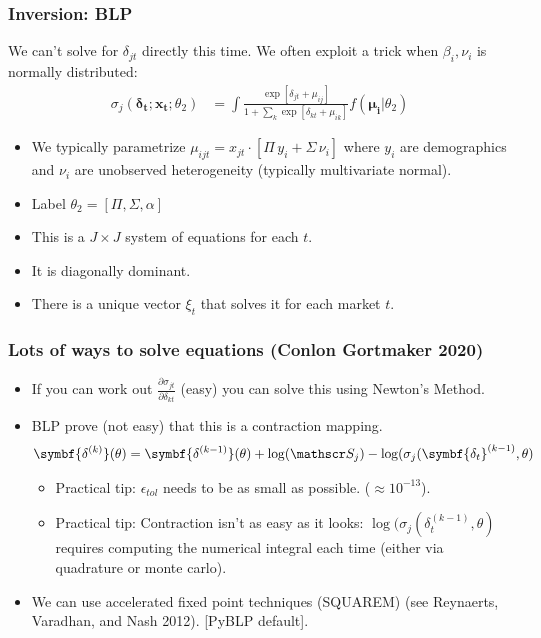 \documentclass[aspectratio=169,10pt]{beamer}
\begin{document}
\begin{frame}
\frametitle{Inversion: BLP}
We can't solve for $\delta_{jt}$ directly this time. We often exploit a trick when $\beta_i,\nu_i$ is normally distributed:
\begin{align*}
\sigma_j(\symbf{\delta_t}; \symbf{x_t}; \theta_2) &= \int \frac{\exp[\delta_{jt} +  \mu_{ij} ]}{1+\sum_k \exp[\delta_{kt} + \mu_{ik} ]} f(\symbf{\mu_i}| \theta_2)
\end{align*}
 \begin{itemize}
    \item We typically parametrize $\mu_{ijt} = x_{jt} \cdot [\Pi \, y_i + \Sigma \, \nu_{i}]$ where $y_i$ are demographics and $\nu_i$ are unobserved heterogeneity (typically multivariate normal).
    \item Label $\theta_2 = [\Pi, \Sigma, \alpha]$
 \item This is a $J \times J$ system of equations for each $t$.
 \item It is diagonally dominant.
 \item There is a unique vector $\xi_t$ that solves it for each market $t$.
 \end{itemize}
\end{frame}

\begin{frame}
\frametitle{Lots of ways to solve equations (Conlon Gortmaker 2020)}
 \begin{itemize}
     \item If you can work out $\frac{\partial \sigma_{jt}}{\partial \delta_{kt}}$ (easy) you can solve this using Newton's Method. 
 \item BLP prove (not easy) that this is a \alert{contraction mapping}.
\begin{align*}
    \symbf{\delta^{(k)}}(\theta) = \symbf{\delta^{(k-1)}}(\theta) + \log(\calS_{j}) - \log(\sigma_{j}(\symbf{\delta_t}^{(k-1)}, \theta)
\end{align*}

\begin{itemize} 
  \item Practical tip: $\epsilon_{tol}$ needs to be as small as possible. ($\approx 10^{-13}$).
 \item Practical tip: Contraction isn't as easy as it looks:  $ \log(\sigma_{j}(\delta_t^{(k-1)}, \theta)$ requires computing the numerical integral each time (either via quadrature or monte carlo).
\end{itemize}
\item We can use \alert{accelerated fixed point} techniques (SQUAREM) (see Reynaerts, Varadhan, and Nash 2012). [PyBLP default].
  \end{itemize}
 \end{frame}
\end{document}
